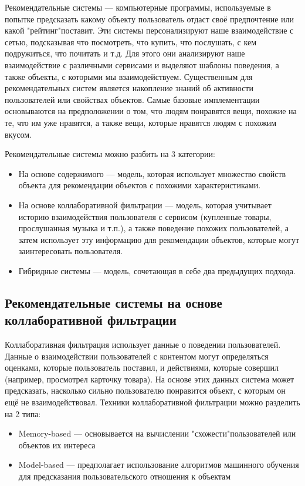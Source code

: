 Рекомендательные системы --- компьютерные программы, используемые в попытке предсказать какому объекту пользователь отдаст своё предпочтение или какой "рейтинг"\space поставит.
Эти системы персонализируют наше взаимодействие с сетью, подсказывая что посмотреть, что купить, что послушать, с кем подружиться, что почитать и т.д. Для этого они анализируют наше взаимодействие с различными сервисами и выделяют шаблоны поведения, а также объекты, с которыми мы взаимодействуем.
Существенным для рекомендательных систем является накопление знаний об активности пользователей или свойствах объектов.
Самые базовые имплементации основываются на предположении о том, что людям понравятся вещи, похожие на те, что им уже нравятся, а также вещи, которые нравятся людям с похожим вкусом.

Рекомендательные системы можно разбить на 3 категории:
\begin{itemize}
\item На основе содержимого --- модель, которая использует множество свойств объекта для рекомендации объектов с похожими характеристиками.
\item На основе коллаборативной фильтрации --- модель, которая учитывает историю взаимодействия пользователя с сервисом (купленные товары, прослушанная музыка и т.п.), а также поведение похожих пользователей, а затем использует эту информацию для рекомендации объектов, которые могут заинтересовать пользователя.
\item Гибридные системы --- модель, сочетающая в себе два предыдущих подхода.
\end{itemize}

\subsection{Рекомендательные системы на основе \\коллаборативной фильтрации}\label{subsec:collaborative_rec_systems}
Коллаборативная фильтрация использует данные о поведении пользователей.
Данные о взаимодействии пользователей с контентом могут определяться оценками, которые пользователь поставил, и действиями, которые совершил (например, просмотрел карточку товара).
На основе этих данных система может предсказать, насколько сильно пользователю понравится объект, с которым он ещё не взаимодействовал.
Техники коллаборативной фильтрации можно разделить на 2 типа:
\begin{itemize}
\item Memory-based --- основывается на вычислении "схожести"\space пользователей или объектов их интереса
\item Model-based --- предполагает использование алгоритмов машинного обучения для предсказания пользовательского отношения к объектам
\end{itemize}
